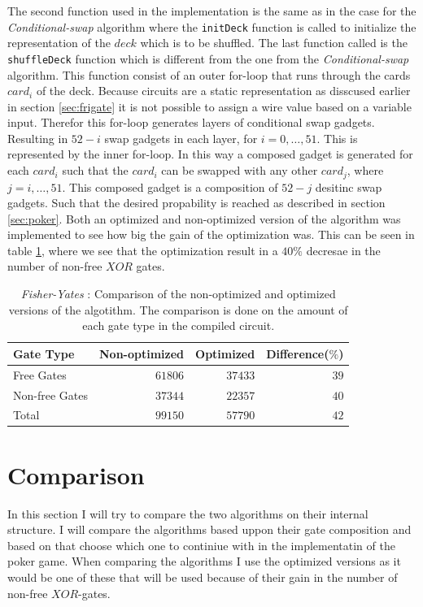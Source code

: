 \documentclass[twoside,11pt,openright]{report}
\newcommand{\FY}{\textit{Fisher-Yates} }
\newcommand{\CS}{\textit{Conditional-swap} }
\begin{document}
The second function used in the implementation is the same as in the case for the \CS algorithm where the \verb|initDeck| function is called to initialize the representation of the $deck$ which is to be shuffled. The last function called is the \verb|shuffleDeck| function which is different from the one from the \CS algorithm. This function consist of an outer for-loop that runs through the cards $card_i$ of the deck. Because circuits are a static representation as disscused earlier in section \ref{sec:frigate} it is not possible to assign a wire value based on a variable input. Therefor this for-loop generates layers of conditional swap gadgets. Resulting in $52-i$ swap gadgets in each layer, for $i=0,\dots, 51$. This is represented by the inner for-loop. In this way a composed gadget is generated for each $card_i$ such that the $card_i$ can be swapped with any other $card_j$, where $j=i,\dots,51$. This composed gadget is a composition of $52-j$ desitinc swap gadgets. Such that the desired propability is reached as described in section \ref{sec:poker}.
Both an optimized and non-optimized version of the algorithm was implemented to see how big the gain of the optimization was. This can be seen in table \ref{table:fy_swap_comp}, where we see that the optimization result in a $40\%$ decresae in the number of non-free $XOR$ gates.

\begin{table}
\centering
\begin{tabular}{l || r r r}
Gate Type      & Non-optimized  & Optimized & Difference($\%$)    \\
\hline
Free Gates     & $61806$        & $37433$   & $39$ \\
Non-free Gates & $37344$        & $22357$   & $40$ \\
\hline
Total          & $99150$        & $57790$   & $42$
\end{tabular}
\caption{\FY: Comparison of the non-optimized and optimized versions of the algotithm. The comparison is done on the amount of each gate type in the compiled circuit.}
\label{table:fy_swap_comp}
\end{table}


\section{Comparison}
\label{sec:comp}

In this section I will try to compare the two algorithms on their internal structure. I will compare the algorithms based uppon their gate composition and based on that choose which one to continiue with in the implementatin of the poker game. When comparing the algorithms I use the optimized versions as it would be one of these that will be used because of their gain in the number of non-free $XOR$-gates.
\end{document}
